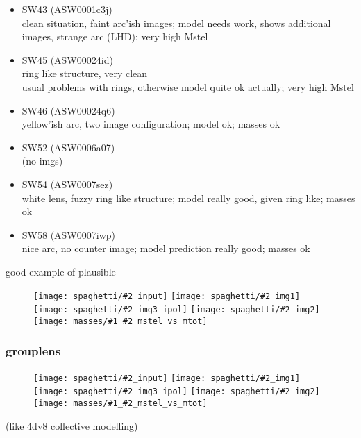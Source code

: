 \documentclass[fleqn,usenatbib]{mnras}
\newcommand{\inclfig}[2]{
  \centering
  \texttt{[image: spaghetti/\#2\_input]} %
  \texttt{[image: spaghetti/\#2\_img1]} \\
  \texttt{[image: spaghetti/\#2\_img3\_ipol]} %
  \texttt{[image: spaghetti/\#2\_img2]} \\
  \texttt{[image: masses/\#1\_\#2\_mstel\_vs\_mtot]}
}
\begin{document}
\begin{itemize}
  \item SW43 (ASW0001c3j) \\
  clean situation, faint arc'ish images;
  model needs work, shows additional images, strange arc (LHD);
  very high Mstel
  
  \item SW45 (ASW00024id)\\
  ring like structure, very clean \\
  usual problems with rings, otherwise model quite ok actually;
  very high Mstel
  
  \item SW46 (ASW00024q6) \\
  yellow'ish arc, two image configuration;
  model ok;
  masses ok
  
  \item SW52 (ASW0006a07) \\
  (no imgs)
  
  \item SW54 (ASW0007sez) \\
  white lens, fuzzy ring like structure;
  model really good, given ring like;
  masses ok
  
  \item SW58 (ASW0007iwp) \\
  nice arc, no counter image;
  model prediction really good;
  masses ok
  
\end{itemize}

good example of plausible


\begin{figure}
  \inclfig{SW58}{ASW0007iwp_4XBJWT3COV}
  \caption{}
\end{figure}


\subsubsection{grouplens}

\begin{figure}
  \inclfig{SW36}{ASW000096t_7IPP7LWVOF}
\end{figure}

(like 4dv8 collective modelling)
\end{document}
